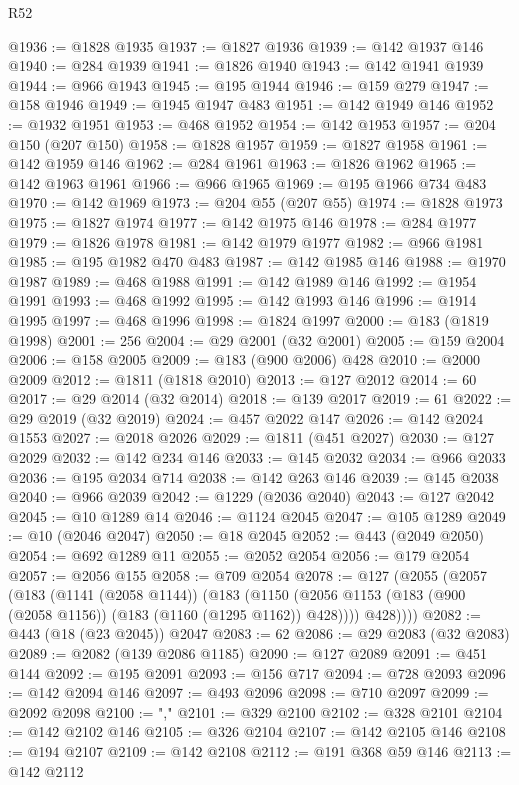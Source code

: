 \begin{lexlean}{R52}
\begin{coremodule}
{{{{{{{{{{{{{{{{{{{{{{{{{{{{{{{{{{{{{{{{{{{{{{{{{{{{{{{{{{{{{{{{{{{{{{{{{{{{{{{{{{{{{{{{{{{{{{{{{{{{{{{{{{{{{{{{{{{{{{{{{{{{{{{{{{{{{{{{{{{{{{{{{{{{{{{{{{{{{{{{{{{{{{{{{{{{{{{{{{{{{{{{{{{{{{{{{{{{{{@1936 := @1828 @1935
@1937 := @1827 @1936
@1939 := @142 @1937 @146
@1940 := @284 @1939
@1941 := @1826 @1940
@1943 := @142 @1941 @1939
@1944 := @966 @1943
@1945 := @195 @1944
@1946 := @159 @279
@1947 := @158 @1946
@1949 := @1945 @1947 @483
@1951 := @142 @1949 @146
@1952 := @1932 @1951
@1953 := @468 @1952
@1954 := @142 @1953
@1957 := @204 @150 (@207 @150)
@1958 := @1828 @1957
@1959 := @1827 @1958
@1961 := @142 @1959 @146
@1962 := @284 @1961
@1963 := @1826 @1962
@1965 := @142 @1963 @1961
@1966 := @966 @1965
@1969 := @195 @1966 @734 @483
@1970 := @142 @1969
@1973 := @204 @55 (@207 @55)
@1974 := @1828 @1973
@1975 := @1827 @1974
@1977 := @142 @1975 @146
@1978 := @284 @1977
@1979 := @1826 @1978
@1981 := @142 @1979 @1977
@1982 := @966 @1981
@1985 := @195 @1982 @470 @483
@1987 := @142 @1985 @146
@1988 := @1970 @1987
@1989 := @468 @1988
@1991 := @142 @1989 @146
@1992 := @1954 @1991
@1993 := @468 @1992
@1995 := @142 @1993 @146
@1996 := @1914 @1995
@1997 := @468 @1996
@1998 := @1824 @1997
@2000 := @183 (@1819 @1998)
@2001 := 256
@2004 := @29 @2001 (@32 @2001)
@2005 := @159 @2004
@2006 := @158 @2005
@2009 := @183 (@900 @2006) @428
@2010 := @2000 @2009
@2012 := @1811 (@1818 @2010)
@2013 := @127 @2012
@2014 := 60
@2017 := @29 @2014 (@32 @2014)
@2018 := @139 @2017
@2019 := 61
@2022 := @29 @2019 (@32 @2019)
@2024 := @457 @2022 @147
@2026 := @142 @2024 @1553
@2027 := @2018 @2026
@2029 := @1811 (@451 @2027)
@2030 := @127 @2029
@2032 := @142 @234 @146
@2033 := @145 @2032
@2034 := @966 @2033
@2036 := @195 @2034 @714
@2038 := @142 @263 @146
@2039 := @145 @2038
@2040 := @966 @2039
@2042 := @1229 (@2036 @2040)
@2043 := @127 @2042
@2045 := @10 @1289 @14
@2046 := @1124 @2045
@2047 := @105 @1289
@2049 := @10 (@2046 @2047)
@2050 := @18 @2045
@2052 := @443 (@2049 @2050)
@2054 := @692 @1289 @11
@2055 := @2052 @2054
@2056 := @179 @2054
@2057 := @2056 @155
@2058 := @709 @2054
@2078 := @127
    (@2055
      (@2057
        (@183
          (@1141 (@2058 @1144))
          (@183
            (@1150 (@2056 @1153 (@183 (@900 (@2058 @1156)) (@183 (@1160 (@1295 @1162)) @428))))
            @428))))
@2082 := @443 (@18 (@23 @2045)) @2047
@2083 := 62
@2086 := @29 @2083 (@32 @2083)
@2089 := @2082 (@139 @2086 @1185)
@2090 := @127 @2089
@2091 := @451 @144
@2092 := @195 @2091
@2093 := @156 @717
@2094 := @728 @2093
@2096 := @142 @2094 @146
@2097 := @493 @2096
@2098 := @710 @2097
@2099 := @2092 @2098
@2100 := ","
@2101 := @329 @2100
@2102 := @328 @2101
@2104 := @142 @2102 @146
@2105 := @326 @2104
@2107 := @142 @2105 @146
@2108 := @194 @2107
@2109 := @142 @2108
@2112 := @191 @368 @59 @146
@2113 := @142 @2112
}}}}}}}}}}}}}}}}}}}}}}}}}}}}}}}}}}}}}}}}}}}}}}}}}}}}}}}}}}}}}}}}}}}}}}}}}}}}}}}}}}}}}}}}}}}}}}}}}}}}}}}}}}}}}}}}}}}}}}}}}}}}}}}}}}}}}}}}}}}}}}}}}}}}}}}}}}}}}}}}}}}}}}}}}}}}}}}}}}}}}}}}}}}}}}}}}}}}}}
\end{coremodule}
\end{lexlean}
